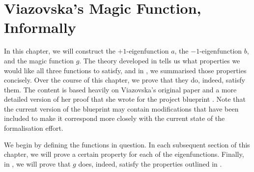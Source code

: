 \chapter{Viazovska's Magic Function, Informally}
\label{Ch4:Chapter}

In this chapter, we will construct the $+1$-eigenfunction $a$, the $-1$-eigenfunction $b$, and the magic function $g$. The theory developed in  tells us what properties we would like all three functions to satisfy, and in , we summarised those properties concisely. Over the course of this chapter, we prove that they do, indeed, satisfy them. The content is based heavily on Viazovska's original paper \cite{Viazovska8} and a more detailed version of her proof that she wrote for the project blueprint \cite{blueprint}. Note that the current version of the blueprint may contain modifications that have been included to make it correspond more closely with the current state of the formalisation effort.

We begin by defining the functions in question. In each subsequent section of this chapter, we will prove a certain property for each of the eigenfunctions. Finally, in , we will prove that $g$ does, indeed, satisfy the properties outlined in .





